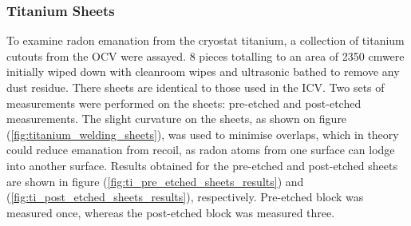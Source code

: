 \subsubsection{Titanium Sheets}

To examine radon emanation from the cryostat titanium, a collection of titanium cutouts from the OCV were assayed. 8 pieces totalling to an area of 2350 cm\squared were initially wiped down with cleanroom wipes and ultrasonic bathed to remove any dust residue. There sheets are identical to those used in the ICV. Two sets of measurements were performed on the sheets: pre-etched and post-etched measurements. The slight curvature on the sheets, as shown on figure (\ref{fig:titanium_welding_sheets}), was used to minimise overlaps, which in theory could reduce emanation from recoil, as radon atoms from one surface can lodge into another surface. Results obtained for the pre-etched and post-etched sheets are shown in figure (\ref{fig:ti_pre_etched_sheets_results}) and (\ref{fig:ti_post_etched_sheets_results}), respectively. Pre-etched block was measured once, whereas the post-etched block was measured three.
%
